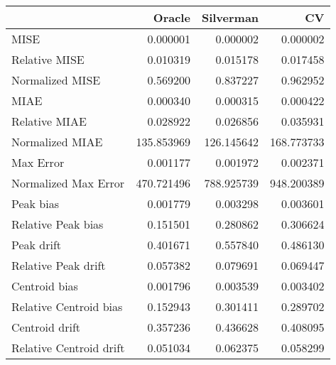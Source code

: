 \begin{tabular}{lrrr}
  \hline
 & Oracle & Silverman & CV \\ 
  \hline
MISE & 0.000001 & 0.000002 & 0.000002 \\ 
  Relative MISE & 0.010319 & 0.015178 & 0.017458 \\ 
  Normalized MISE & 0.569200 & 0.837227 & 0.962952 \\ 
  MIAE & 0.000340 & 0.000315 & 0.000422 \\ 
  Relative MIAE & 0.028922 & 0.026856 & 0.035931 \\ 
  Normalized MIAE & 135.853969 & 126.145642 & 168.773733 \\ 
  Max Error & 0.001177 & 0.001972 & 0.002371 \\ 
  Normalized Max Error & 470.721496 & 788.925739 & 948.200389 \\ 
  Peak bias & 0.001779 & 0.003298 & 0.003601 \\ 
  Relative Peak bias & 0.151501 & 0.280862 & 0.306624 \\ 
  Peak drift & 0.401671 & 0.557840 & 0.486130 \\ 
  Relative Peak drift & 0.057382 & 0.079691 & 0.069447 \\ 
  Centroid bias & 0.001796 & 0.003539 & 0.003402 \\ 
  Relative Centroid bias & 0.152943 & 0.301411 & 0.289702 \\ 
  Centroid drift & 0.357236 & 0.436628 & 0.408095 \\ 
  Relative Centroid drift & 0.051034 & 0.062375 & 0.058299 \\ 
   \hline
\end{tabular}
